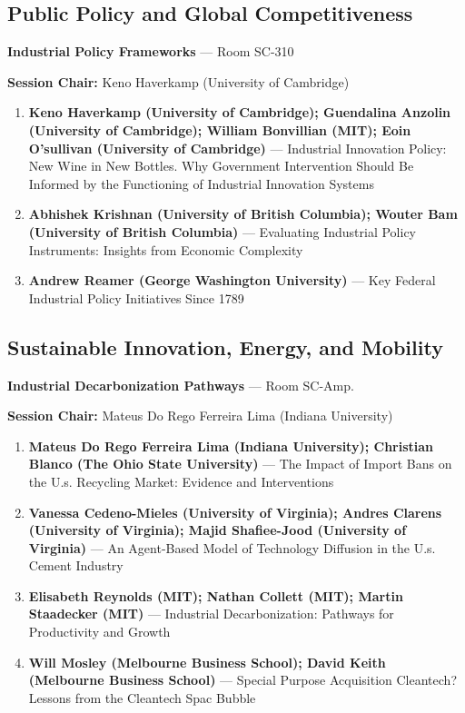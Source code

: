 \documentclass[
  10pt,
  letterpaper,
  DIV=11,
  numbers=noendperiod]{scrartcl}
\begin{document}
\subsection{\texorpdfstring{\textcolor{policy}{Public Policy and Global Competitiveness}}{}}\label{section-58}

\textbf{Industrial Policy Frameworks} --- Room SC-310

\textbf{Session Chair:} Keno Haverkamp (University of Cambridge)

\begin{enumerate}
\def\labelenumi{\arabic{enumi}.}
\item
  \textbf{Keno Haverkamp (University of Cambridge); Guendalina Anzolin
  (University of Cambridge); William Bonvillian (MIT); Eoin O'sullivan
  (University of Cambridge)} --- Industrial Innovation Policy: New Wine
  in New Bottles. Why Government Intervention Should Be Informed by the
  Functioning of Industrial Innovation Systems
\item
  \textbf{Abhishek Krishnan (University of British Columbia); Wouter Bam
  (University of British Columbia)} --- Evaluating Industrial Policy
  Instruments: Insights from Economic Complexity
\item
  \textbf{Andrew Reamer (George Washington University)} --- Key Federal
  Industrial Policy Initiatives Since 1789
\end{enumerate}

\subsection{\texorpdfstring{\textcolor{sustainability}{Sustainable Innovation, Energy, and Mobility}}{}}\label{section-59}

\textbf{Industrial Decarbonization Pathways} --- Room SC-Amp.

\textbf{Session Chair:} Mateus Do Rego Ferreira Lima (Indiana
University)

\begin{enumerate}
\def\labelenumi{\arabic{enumi}.}
\item
  \textbf{Mateus Do Rego Ferreira Lima (Indiana University); Christian
  Blanco (The Ohio State University)} --- The Impact of Import Bans on
  the U.s. Recycling Market: Evidence and Interventions
\item
  \textbf{Vanessa Cedeno-Mieles (University of Virginia); Andres Clarens
  (University of Virginia); Majid Shafiee-Jood (University of Virginia)}
  --- An Agent-Based Model of Technology Diffusion in the U.s. Cement
  Industry
\item
  \textbf{Elisabeth Reynolds (MIT); Nathan Collett (MIT); Martin
  Staadecker (MIT)} --- Industrial Decarbonization: Pathways for
  Productivity and Growth
\item
  \textbf{Will Mosley (Melbourne Business School); David Keith
  (Melbourne Business School)} --- Special Purpose Acquisition
  Cleantech? Lessons from the Cleantech Spac Bubble
\end{enumerate}
\end{document}
